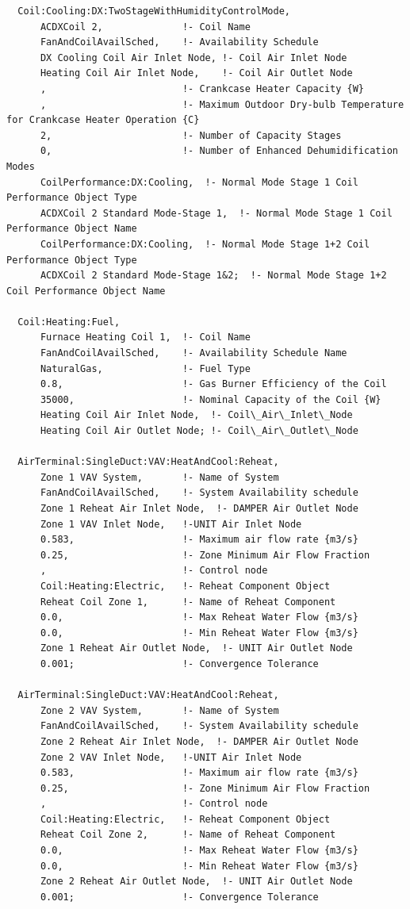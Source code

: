 \begin{lstlisting}
  Coil:Cooling:DX:TwoStageWithHumidityControlMode,
      ACDXCoil 2,              !- Coil Name
      FanAndCoilAvailSched,    !- Availability Schedule
      DX Cooling Coil Air Inlet Node, !- Coil Air Inlet Node
      Heating Coil Air Inlet Node,    !- Coil Air Outlet Node
      ,                        !- Crankcase Heater Capacity {W}
      ,                        !- Maximum Outdoor Dry-bulb Temperature for Crankcase Heater Operation {C}
      2,                       !- Number of Capacity Stages
      0,                       !- Number of Enhanced Dehumidification Modes
      CoilPerformance:DX:Cooling,  !- Normal Mode Stage 1 Coil Performance Object Type
      ACDXCoil 2 Standard Mode-Stage 1,  !- Normal Mode Stage 1 Coil Performance Object Name
      CoilPerformance:DX:Cooling,  !- Normal Mode Stage 1+2 Coil Performance Object Type
      ACDXCoil 2 Standard Mode-Stage 1&2;  !- Normal Mode Stage 1+2 Coil Performance Object Name

  Coil:Heating:Fuel,
      Furnace Heating Coil 1,  !- Coil Name
      FanAndCoilAvailSched,    !- Availability Schedule Name
      NaturalGas,              !- Fuel Type
      0.8,                     !- Gas Burner Efficiency of the Coil
      35000,                   !- Nominal Capacity of the Coil {W}
      Heating Coil Air Inlet Node,  !- Coil\_Air\_Inlet\_Node
      Heating Coil Air Outlet Node; !- Coil\_Air\_Outlet\_Node

  AirTerminal:SingleDuct:VAV:HeatAndCool:Reheat,
      Zone 1 VAV System,       !- Name of System
      FanAndCoilAvailSched,    !- System Availability schedule
      Zone 1 Reheat Air Inlet Node,  !- DAMPER Air Outlet Node
      Zone 1 VAV Inlet Node,   !-UNIT Air Inlet Node
      0.583,                   !- Maximum air flow rate {m3/s}
      0.25,                    !- Zone Minimum Air Flow Fraction
      ,                        !- Control node
      Coil:Heating:Electric,   !- Reheat Component Object
      Reheat Coil Zone 1,      !- Name of Reheat Component
      0.0,                     !- Max Reheat Water Flow {m3/s}
      0.0,                     !- Min Reheat Water Flow {m3/s}
      Zone 1 Reheat Air Outlet Node,  !- UNIT Air Outlet Node
      0.001;                   !- Convergence Tolerance

  AirTerminal:SingleDuct:VAV:HeatAndCool:Reheat,
      Zone 2 VAV System,       !- Name of System
      FanAndCoilAvailSched,    !- System Availability schedule
      Zone 2 Reheat Air Inlet Node,  !- DAMPER Air Outlet Node
      Zone 2 VAV Inlet Node,   !-UNIT Air Inlet Node
      0.583,                   !- Maximum air flow rate {m3/s}
      0.25,                    !- Zone Minimum Air Flow Fraction
      ,                        !- Control node
      Coil:Heating:Electric,   !- Reheat Component Object
      Reheat Coil Zone 2,      !- Name of Reheat Component
      0.0,                     !- Max Reheat Water Flow {m3/s}
      0.0,                     !- Min Reheat Water Flow {m3/s}
      Zone 2 Reheat Air Outlet Node,  !- UNIT Air Outlet Node
      0.001;                   !- Convergence Tolerance


\end{lstlisting}
